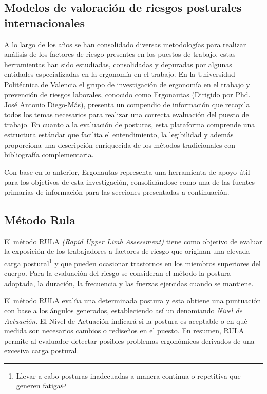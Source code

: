 \subsection{Modelos de valoración de riesgos posturales internacionales}
A lo largo de los años se han consolidado diversas metodologías para realizar análisis de los factores de riesgo presentes en los puestos de trabajo, estas herramientas han sido estudiadas, consolidadas y depuradas por algunas entidades especializadas en la ergonomía en el trabajo. En la Universidad Politécnica de Valencia el grupo de investigación de ergonomía en el trabajo y prevención de riesgos laborales, conocido como Ergonautas (Dirigido por Phd. José Antonio Diego-Más), presenta un compendio de información que recopila todos los temas necesarios para realizar una correcta evaluación del puesto de trabajo. En cuanto a la evaluación de posturas, esta plataforma comprende una estructura estándar que facilita el entendimiento, la legibilidad y además proporciona una descripción enriquecida de los métodos tradicionales con bibliografía complementaria. 

Con base en lo anterior, Ergonautas representa una herramienta de apoyo útil para los objetivos de esta investigación, consolidándose como una de las fuentes primarias de información para las secciones presentadas a continuación.

\subsection{Método Rula}
El método RULA \textit{(Rapid Upper Limb Assessment)} tiene como objetivo de evaluar la exposición de los trabajadores a factores de riesgo que originan una elevada carga postural\footnote{Llevar a cabo posturas inadecuadas a manera continua o repetitiva que generen fatiga} y que pueden ocasionar trastornos en los miembros superiores del cuerpo. Para la evaluación del riesgo se consideran el método la postura adoptada, la duración, la frecuencia y las fuerzas ejercidas cuando se mantiene.\parencite[2]{Mcatamney1993RULA:Disorders}

El método RULA evalúa una determinada postura y esta obtiene una puntuación con base a los ángulos generados, estableciendo así un denomiando \textit{Nivel de Actuación}. El Nivel de Actuación indicará si la postura es aceptable o en qué medida son necesarios cambios o rediseños en el puesto. En resumen, RULA permite al evaluador detectar posibles problemas ergonómicos derivados de una excesiva carga postural.\parencite{Diego-Mas2015EvaluacionRULA}\parencite[4]{Mcatamney1993RULA:Disorders}

